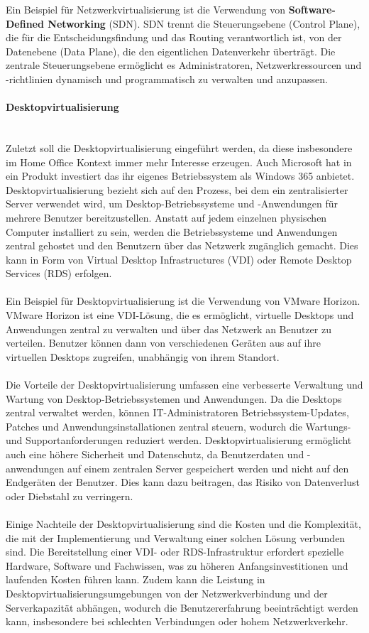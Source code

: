 Ein Beispiel für Netzwerkvirtualisierung ist die Verwendung von \textbf{Software-Defined Networking} (SDN). SDN trennt die Steuerungsebene (Control Plane), die für die Entscheidungsfindung und das Routing verantwortlich ist, von der Datenebene (Data Plane), die den eigentlichen Datenverkehr überträgt. Die zentrale Steuerungsebene ermöglicht es Administratoren, Netzwerkressourcen und -richtlinien dynamisch und programmatisch zu verwalten und anzupassen.

\paragraph{Desktopvirtualisierung\\\\}
Zuletzt soll die Desktopvirtualisierung eingeführt werden, da diese insbesondere im Home Office Kontext immer mehr Interesse erzeugen. Auch Microsoft hat in ein Produkt investiert das ihr eigenes Betriebssystem als Windows 365 anbietet. Desktopvirtualisierung bezieht sich auf den Prozess, bei dem ein zentralisierter Server verwendet wird, um Desktop-Betriebssysteme und -Anwendungen für mehrere Benutzer bereitzustellen. Anstatt auf jedem einzelnen physischen Computer installiert zu sein, werden die Betriebssysteme und Anwendungen zentral gehostet und den Benutzern über das Netzwerk zugänglich gemacht. Dies kann in Form von Virtual Desktop Infrastructures (VDI) oder Remote Desktop Services (RDS) erfolgen.
\\\\
Ein Beispiel für Desktopvirtualisierung ist die Verwendung von VMware Horizon. VMware Horizon ist eine VDI-Lösung, die es ermöglicht, virtuelle Desktops und Anwendungen zentral zu verwalten und über das Netzwerk an Benutzer zu verteilen. Benutzer können dann von verschiedenen Geräten aus auf ihre virtuellen Desktops zugreifen, unabhängig von ihrem Standort.
\\\\
Die Vorteile der Desktopvirtualisierung umfassen eine verbesserte Verwaltung und Wartung von Desktop-Betriebssystemen und Anwendungen. Da die Desktops zentral verwaltet werden, können IT-Administratoren Betriebssystem-Updates, Patches und Anwendungsinstallationen zentral steuern, wodurch die Wartungs- und Supportanforderungen reduziert werden. Desktopvirtualisierung ermöglicht auch eine höhere Sicherheit und Datenschutz, da Benutzerdaten und -anwendungen auf einem zentralen Server gespeichert werden und nicht auf den Endgeräten der Benutzer. Dies kann dazu beitragen, das Risiko von Datenverlust oder Diebstahl zu verringern.
\\\\
Einige Nachteile der Desktopvirtualisierung sind die Kosten und die Komplexität, die mit der Implementierung und Verwaltung einer solchen Lösung verbunden sind. Die Bereitstellung einer VDI- oder RDS-Infrastruktur erfordert spezielle Hardware, Software und Fachwissen, was zu höheren Anfangsinvestitionen und laufenden Kosten führen kann. Zudem kann die Leistung in Desktopvirtualisierungsumgebungen von der Netzwerkverbindung und der Serverkapazität abhängen, wodurch die Benutzererfahrung beeinträchtigt werden kann, insbesondere bei schlechten Verbindungen oder hohem Netzwerkverkehr.
